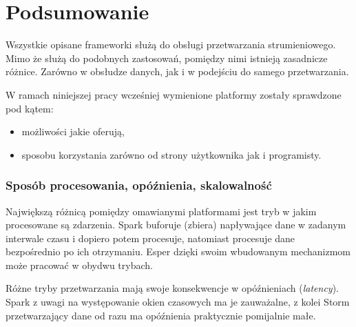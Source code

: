 \section{Podsumowanie}

Wszystkie opisane frameworki służą do obsługi przetwarzania strumieniowego.
Mimo że służą do podobnych zastosowań,
pomiędzy nimi istnieją zasadnicze różnice.
Zarówno w obsłudze danych,
jak i w podejściu do samego przetwarzania.

W ramach niniejszej pracy wcześniej wymienione platformy zostały sprawdzone pod kątem:
\begin{itemize}
  \item możliwości jakie oferują,
  \item sposobu korzystania zarówno od strony użytkownika jak i programisty.
\end{itemize}

\subsubsection*{Sposób procesowania, opóźnienia, skalowalność}
Największą różnicą pomiędzy omawianymi platformami jest tryb w jakim procesowane są zdarzenia.
Spark buforuje (zbiera) napływające dane w zadanym interwale czasu i dopiero potem procesuje,
natomiast procesuje dane bezpośrednio po ich otrzymaniu.
Esper dzięki swoim wbudowanym mechanizmom może pracować w obydwu trybach.

Różne tryby przetwarzania mają swoje konsekwencje w opóźnieniach (\textit{latency}).
Spark z uwagi na występowanie okien czasowych ma je zauważalne,
z kolei Storm przetwarzający dane od razu ma opóźnienia praktycznie pomijalnie małe.

